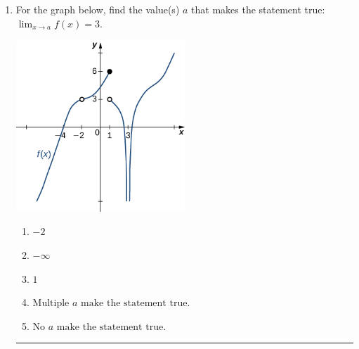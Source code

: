 \documentclass[14pt]{extbook}
\newcommand{\litem}[1]{\item#1\hspace*{-1cm}\rule{\textwidth}{0.4pt}}
\begin{document}
\begin{enumerate}
{\begin{enumerate}[label=\Alph*.]
\end{enumerate} }
\litem{
For the graph below, find the value(s) $a$ that makes the statement true: $ \displaystyle \lim_{x \rightarrow a} f(x) = 3$.
\begin{center}
    \includegraphics[width=0.5\textwidth]{../Figures/evaluateLimitGraphicallyCopyA.png}
\end{center}
\begin{enumerate}[label=\Alph*.]
\item \( -2 \)
\item \( -\infty \)
\item \( 1 \)
\item \( \text{Multiple } a \text{ make the statement true}. \)
\item \( \text{No } a \text{ make the statement true}. \)

\end{enumerate} }
\end{enumerate}
\end{document}
